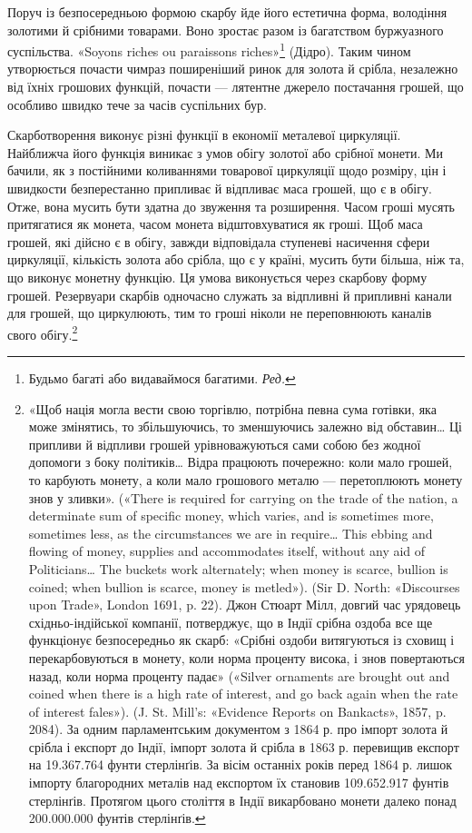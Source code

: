 Поруч із безпосередньою формою скарбу йде його естетична
форма, володіння золотими й срібними товарами. Воно зростає
разом із багатством буржуазного суспільства. «Soyons riches
ou paraissons riches»\footnote*{
Будьмо багаті або видаваймося багатими. \emph{Ред.}
} (Дідро). Таким чином утворюється почасти
чимраз поширеніший ринок для золота й срібла, незалежно від
їхніх грошових функцій, почасти — лятентне джерело постачання
грошей, що особливо швидко тече за часів суспільних бур.

Скарботворення виконує різні функції в економії металевої
циркуляції. Найближча його функція виникає з умов обігу золотої\parbreak{}
або срібної монети. Ми бачили, як з постійними коливаннями
товарової циркуляції щодо розміру, цін і швидкости безперестанно
припливає й відпливає маса грошей, що є в обігу. Отже, вона
мусить бути здатна до звуження та розширення. Часом гроші
мусять притягатися як монета, часом монета відштовхуватися
як гроші. Щоб маса грошей, які дійсно є в обігу, завжди відповідала
ступеневі насичення сфери циркуляції, кількість золота
або срібла, що є у країні, мусить бути більша, ніж та, що виконує
монетну функцію. Ця умова виконується через скарбову
форму грошей. Резервуари скарбів одночасно служать за відпливні
й припливні канали для грошей, що циркулюють, тим то
гроші ніколи не переповнюють каналів свого обігу.\footnote{«Щоб нація могла вести свою торгівлю, потрібна певна сума
готівки, яка може змінятись, то збільшуючись, то зменшуючись залежно
від обставин\dots{} Ці припливи й відпливи грошей урівноважуються
сами собою без жодної допомоги з боку політиків\dots{} Відра працюють почережно:
коли мало грошей, то карбують монету, а коли мало грошового
металю — перетоплюють монету знов у зливки». («There is required for
carrying on the trade of the nation, a determinate sum of specific money,
which varies, and is sometimes more, sometimes less, as the circumstances
we are in require\dots{} This ebbing and flowing of money, supplies and accommodates
itself, without any aid of Politicians\dots{} The buckets work alternately;
when money is scarce, bullion is coined; when bullion is scarce, money
is metled»). (Sir D. North: «Discourses upon Trade», London 1691, p. 22).
Джон Стюарт Мілл, довгий час урядовець східньо-індійської компанії,
потверджує, що в Індії срібна оздоба все ще функціонує безпосередньо як
скарб: «Срібні оздоби витягуються із сховищ і перекарбовуються в монету,
коли норма проценту висока, і знов повертаються назад, коли норма проценту
падає» («Silver ornaments are brought out and coined when there
is a high rate of interest, and go back again when the rate of interest fales»).
(J. St. Mill’s: «Evidence Reports on Bankacts», 1857, p. 2084). За одним
парламентським документом з 1864 р. про імпорт золота й срібла і експорт
до Індії, імпорт золота й срібла в 1863 р. перевищив експорт на 19.367.764
фунти стерлінґів. За вісім останніх років перед 1864 р. лишок імпорту
благородних металів над експортом їх становив 109.652.917 фунтів стерлінґів.
Протягом цього століття в Індії викарбовано монети далеко понад
200.000.000 фунтів стерлінґів.}

